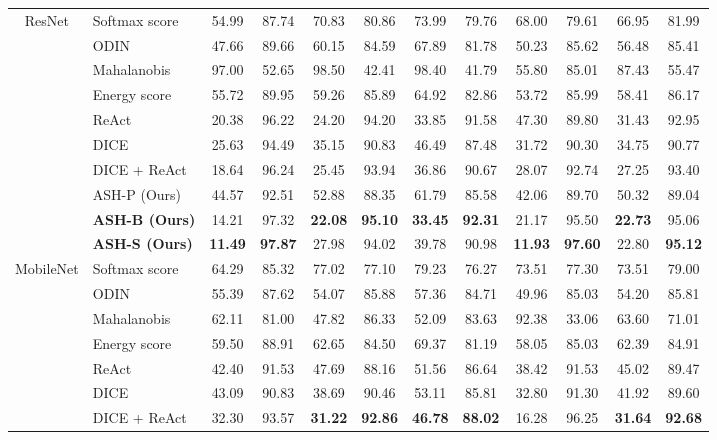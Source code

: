 \documentclass{article}
\begin{document}
\begin{table}[hbt!]
{\begin{tabular}{c c c c c c c c c c c c}
\multirow{10}{*}{ResNet} & \multicolumn{1}{l}{Softmax score} & 54.99 & 87.74 & 70.83 & 80.86 & 73.99 & 79.76 & 68.00 & 79.61 & 66.95 & 81.99 \\
& \multicolumn{1}{l}{ODIN} & 47.66 & 89.66 & 60.15 & 84.59 & 67.89 & 81.78 & 50.23 & 85.62 & 56.48 & 85.41 \\
& \multicolumn{1}{l}{Mahalanobis} & 97.00 & 52.65 & 98.50 & 42.41 & 98.40 & 41.79 & 55.80 & 85.01 & 87.43 & 55.47 \\
& \multicolumn{1}{l}{Energy score} & 55.72 & 89.95 & 59.26 & 85.89 & 64.92 & 82.86 & 53.72 & 85.99 & 58.41 & 86.17 \\
& \multicolumn{1}{l}{ReAct} & 20.38 & 96.22 & 24.20 & 94.20 & 33.85 & 91.58 & 47.30 & 89.80 & 31.43 & 92.95 \\
& \multicolumn{1}{l}{DICE} & 25.63 & 94.49 & 35.15 & 90.83 & 46.49 &  87.48 & 31.72 & 90.30 & 34.75 & 90.77 \\
& \multicolumn{1}{l}{DICE + ReAct} & 18.64 & 96.24 & 25.45 & 93.94 & 36.86 & 90.67 & 28.07 & 92.74 & 27.25 & 93.40 \\
\rowcolor{lightgray} & \multicolumn{1}{l}{ASH-P (Ours)} & 44.57 & 92.51 & 52.88 & 88.35 & 61.79 & 85.58 & 42.06 & 89.70 & 50.32 & 89.04 \\
\rowcolor{lightgray} & \multicolumn{1}{l}{\textbf{ASH-B (Ours)} } & 14.21 & 97.32 & \textbf{22.08} & \textbf{95.10} & \textbf{33.45} & \textbf{92.31} & 21.17 & 95.50 & \textbf{22.73} & 95.06 \\
\rowcolor{lightgray} & \multicolumn{1}{l}{\textbf{ASH-S (Ours)} } & \textbf{11.49} & \textbf{97.87} & 27.98 & 94.02 & 39.78 & 90.98 & \textbf{11.93} & \textbf{97.60} & 22.80 & \textbf{95.12} \\
\midrule
\multirow{10}{*}{MobileNet} & \multicolumn{1}{l}{Softmax score} & 64.29 & 85.32 & 77.02 & 77.10 & 79.23 & 76.27 & 73.51 & 77.30 & 73.51 & 79.00 \\
& \multicolumn{1}{l}{ODIN} & 55.39 & 87.62 & 54.07 & 85.88 & 57.36 & 84.71 & 49.96 & 85.03 & 54.20 & 85.81 \\
& \multicolumn{1}{l}{Mahalanobis} & 62.11 & 81.00 & 47.82 & 86.33 & 52.09 & 83.63 & 92.38 & 33.06 & 63.60 & 71.01 \\
& \multicolumn{1}{l}{Energy score} & 59.50 & 88.91 & 62.65 & 84.50 & 69.37 & 81.19 & 58.05 & 85.03 & 62.39 & 84.91 \\
& \multicolumn{1}{l}{ReAct} & 42.40 & 91.53 & 47.69 & 88.16 & 51.56 & 86.64 & 38.42 & 91.53 & 45.02 & 89.47 \\
& \multicolumn{1}{l}{DICE} & 43.09 &  90.83 & 38.69 & 90.46 & 53.11 & 85.81 & 32.80 & 91.30 & 41.92 & 89.60 \\
& \multicolumn{1}{l}{DICE + ReAct} & 32.30 & 93.57 & \textbf{31.22} & \textbf{92.86} & \textbf{46.78} & \textbf{88.02} & 16.28 & 96.25 & \textbf{31.64} & \textbf{92.68} \\


\end{tabular}}
\end{table}
\end{document}
